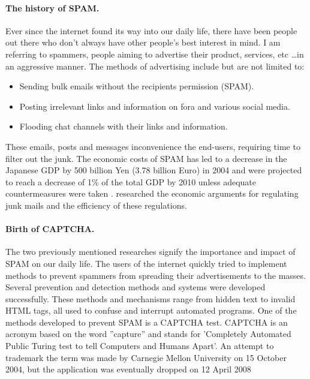 \documentclass[pdftex,a4paper,12pt,twoside]{report}
\theoremstyle{plain} \newtheorem{theorem}{Theorem} \newtheorem{proposition}{Proposition} \newtheorem{lemma}{Lemma} \newtheorem*{corollary}{Corollary}
\theoremstyle{definition} \newtheorem{definition}{Definition} \newtheorem{conjecture}{Conjecture} \newtheorem*{example}{Example} \newtheorem{algorithm}{Algorithm}
\theoremstyle{remark} \newtheorem*{remark}{Remark} \newtheorem*{note}{Note} \newtheorem{case}{Case}
\begin{document}
\paragraph{The history of SPAM.} 
Ever since the internet found its way into our daily life, there have been people out there who don't always have other people's best interest in mind. I am referring to spammers, people aiming to advertise their product, services, etc \ldots in an aggressive manner. The methods of advertising include but are not limited to: \begin{itemize}
\item Sending bulk emails without the recipients permission (SPAM). 
\item Posting irrelevant links and information on fora and various social media.
\item Flooding chat channels with their links and information. 
\end{itemize}
These emails, posts and messages inconvenience the end-users, requiring time to filter out the junk. The economic costs of SPAM has led to a decrease in the Japanese GDP by 500 billion Yen (3.78 billion Euro) in 2004 and were projected to reach a decrease of 1\% of the total GDP by 2010 unless adequate countermeasures were taken \citep{Ukai2007}. \citep{Khong2004} researched the economic arguments for regulating junk mails and the efficiency of these regulations.
\paragraph{Birth of CAPTCHA.} 
The two previously mentioned researches signify the importance and impact of SPAM on our daily life. The users of the internet quickly tried to implement methods to prevent spammers from spreading their advertisements to the masses. Several prevention and detection methods and systems were developed successfully. These methods and mechanisms range from hidden text to invalid HTML tags, all used to confuse and interrupt automated programs. One of the methods developed to prevent SPAM is a CAPTCHA test. CAPTCHA is an acronym based on the word ''capture'' and stands for 'Completely Automated Public Turing test to tell Computers and Humans Apart'. An attempt to trademark  the term was made by Carnegie Mellon University on 15 October 2004, but the application was eventually dropped on 12 April 2008
\end{document}
